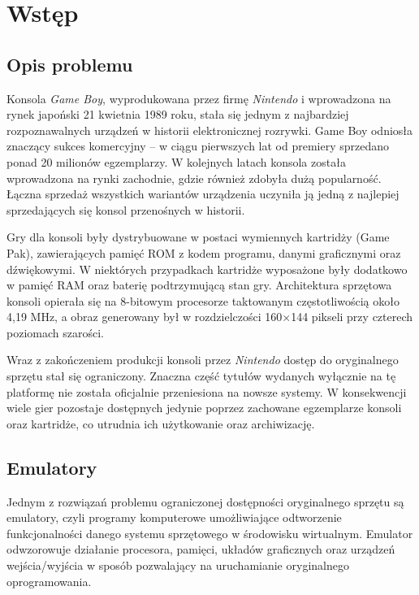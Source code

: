 \documentclass{article}
\begin{document}
\section{Wstęp}

\subsection{Opis problemu}

Konsola \textit{Game Boy}, wyprodukowana przez firmę \textit{Nintendo} i wprowadzona na rynek japoński 21 kwietnia 1989 roku, stała się jednym z najbardziej rozpoznawalnych urządzeń w historii elektronicznej rozrywki. Game Boy odniosła znaczący sukces komercyjny – w ciągu pierwszych lat od premiery sprzedano ponad 20 milionów egzemplarzy. W kolejnych latach konsola została wprowadzona na rynki zachodnie, gdzie również zdobyła dużą popularność. Łączna sprzedaż wszystkich wariantów urządzenia uczyniła ją jedną z najlepiej sprzedających się konsol przenośnych w historii.

Gry dla konsoli były dystrybuowane w postaci wymiennych kartridży (Game Pak), zawierających pamięć ROM z kodem programu, danymi graficznymi oraz dźwiękowymi. W niektórych przypadkach kartridże wyposażone były dodatkowo w pamięć RAM oraz baterię podtrzymującą stan gry. Architektura sprzętowa konsoli opierała się na 8-bitowym procesorze taktowanym częstotliwością około 4,19 MHz, a obraz generowany był w rozdzielczości 160×144 pikseli przy czterech poziomach szarości.

Wraz z zakończeniem produkcji konsoli przez \textit{Nintendo} dostęp do oryginalnego sprzętu stał się ograniczony. Znaczna część tytułów wydanych wyłącznie na tę platformę nie została oficjalnie przeniesiona na nowsze systemy. W konsekwencji wiele gier pozostaje dostępnych jedynie poprzez zachowane egzemplarze konsoli oraz kartridże, co utrudnia ich użytkowanie oraz archiwizację.

\subsection{Emulatory}

Jednym z rozwiązań problemu ograniczonej dostępności oryginalnego sprzętu są emulatory, czyli programy komputerowe umożliwiające odtworzenie funkcjonalności danego systemu sprzętowego w środowisku wirtualnym. Emulator odwzorowuje działanie procesora, pamięci, układów graficznych oraz urządzeń wejścia/wyjścia w sposób pozwalający na uruchamianie oryginalnego oprogramowania.
\end{document}
